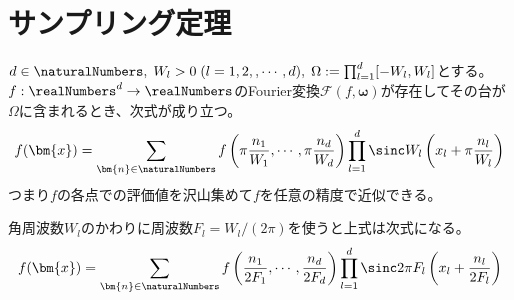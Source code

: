 		\chapter{サンプリング定理}
			\begin{shadebox}
				$d\in\naturalNumbers,\;W_l>0\;(l=1,2,,\cdots,d),\;\Omega:=\prod_{l=1}^d [-W_l,W_l]$とする。
				$f:\realNumbers^d\to\realNumbers$のFourier変換$\mathcal{F}(f,\bm{\omega})$が存在してその台が$\Omega$に含まれるとき、次式が成り立つ。
				\[ f(\bm{x}) = \sum_{\bm{n}\in\naturalNumbers}f\left(\pi\frac{n_1}{W_1},\cdots,\pi\frac{n_d}{W_d}\right)\prod_{l=1}^d\sinc W_l\left(x_l + \pi\frac{n_l}{W_l}\right) \]
				つまり$f$の各点での評価値を沢山集めて$f$を任意の精度で近似できる。
				\par
				角周波数$W_l$のかわりに周波数$F_l=W_l/(2\pi)$を使うと上式は次式になる。
				\[ f(\bm{x}) = \sum_{\bm{n}\in\naturalNumbers}f\left(\frac{n_1}{2F_1},\cdots,\frac{n_d}{2F_d}\right)\prod_{l=1}^d\sinc 2\pi F_l\left(x_l + \frac{n_l}{2F_l}\right) \]
			\end{shadebox}

